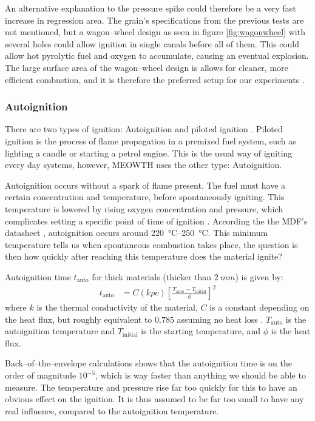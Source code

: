 		An alternative explanation to the pressure spike could therefore be a very fast increase in regression area. The grain's specifications from the previous tests are not mentioned, but a wagon--wheel design as seen in figure \ref{fig:wagonwheel} with several holes could allow ignition in single canals before all of them. This could allow hot pyrolytic fuel and oxygen to accumulate, causing an eventual explosion. The large surface area of the wagon--wheel design is allows for cleaner, more efficient combustion, and it is therefore the preferred setup for our experiments \cite{nakka}.

	\subsubsection{Autoignition}

		There are two types of ignition: Autoignition and piloted ignition \cite[chapter 4, pp.~66]{principlesoffire}. Piloted ignition is the process of flame propagation in a premixed fuel system, such as lighting a candle or starting a petrol engine. This is the usual way of igniting every day systems, however, MEOWTH uses the other type: Autoignition.

		Autoignition occurs without a spark of flame present. The fuel must have a certain concentration and temperature, before spontaneously igniting. This temperature is lowered by rising oxygen concentration and pressure, which complicates setting a specific point of time of ignition \cite{ASTMautoign}. According the the MDF's datasheet \cite{mdfAIT}, autoignition occurs around \SIrange{220}{250}{\celsius}. This minimum temperature tells us when spontaneous combustion takes place, the question is then how quickly after reaching this temperature does the material ignite?

		Autoignition time $t_\text{auto}$ for thick materials (thicker than $\SI{2}{mm}$) is given by:
		\begin{align*}
			t_\text{auto} &= C (k \rho c) \left[\frac{T_\text{auto} - T_\text{initial}}{\phi} \right]^2
		\end{align*}
		where $k$ is the thermal conductivity of the material, $C$ is a constant depending on the heat flux, but roughly equivalent to $0.785$ assuming no heat loss \cite[chapter 4, pp.~71]{principlesoffire}. $T_\text{auto}$ is the autoignition temperature and $T_\text{initial}$ is the starting temperature, and $\phi$ is the heat flux.

		Back--of--the--envelope calculations shows that the autoignition time is on the order of magnitude $10^{-5}$, which is way faster than anything we should be able to measure. The temperature and pressure rise far too quickly for this to have an obvious effect on the ignition. It is thus assumed to be far too small to have any real influence, compared to the autoignition temperature.

